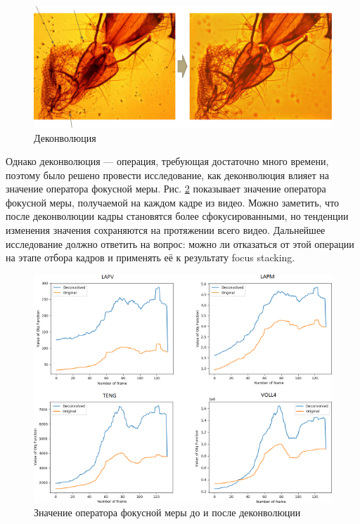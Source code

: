 \documentclass[14pt]{matmex-diploma-custom}
\begin{document}
\begin{figure}[h]
\centering
\includegraphics[width=1.0\textwidth]{figures/deconvolution1.png}
\caption{Деконволюция}
\label{deconvolution1}
\end{figure}

\newpage

Однако деконволюция --- операция, требующая достаточно много времени, поэтому было решено провести исследование, как деконволюция влияет на значение оператора фокусной меры. Рис. \ref{deconvolution2} показывает значение оператора фокусной меры, получаемой на каждом кадре из видео. Можно заметить, что после деконволюции кадры становятся более сфокусированными, но тенденции изменения значения сохраняются на протяжении всего видео. Дальнейшее исследование должно ответить на вопрос: можно ли отказаться от этой операции на этапе отбора кадров и применять её к результату focus stacking.

\begin{figure}[h]
\centering
\includegraphics[width=1.0\textwidth]{figures/deconvolution2.png}
\caption{Значение оператора фокусной меры до и после деконволюции}
\label{deconvolution2}
\end{figure}
\end{document}
